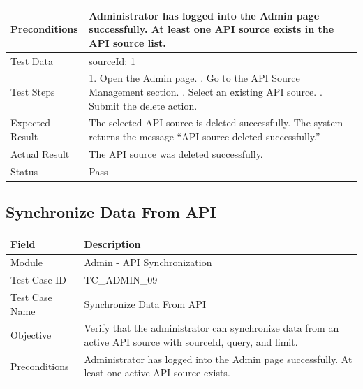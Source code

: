 \documentclass[12pt,a4paper]{article}
\begin{document}
{{\begin{longtable}{|p{4cm}|p{10cm}|}
	Preconditions &
	Administrator has logged into the Admin page successfully. \newline
	At least one API source exists in the API source list.
	\\ \hline
	
	Test Data &
	sourceId: 1
	\\ \hline
	
	Test Steps &
	1. Open the Admin page. \newline
	2. Go to the API Source Management section. \newline
	3. Select an existing API source. \newline
	4. Submit the delete action.
	\\ \hline
	
	Expected Result &
	The selected API source is deleted successfully. The system returns the message ``API source deleted successfully.'' \\ \hline
	
	Actual Result &
	The API source was deleted successfully. \\ \hline
	
	Status & Pass \\ \hline
	
\end{longtable}
\subsection{Synchronize Data From API}
\begin{longtable}{|p{4cm}|p{10cm}|}
	\hline
	\textbf{Field} & \textbf{Description} \\ \hline
	
	Module & Admin - API Synchronization \\ \hline
	
	Test Case ID & TC\_ADMIN\_09 \\ \hline
	
	Test Case Name & Synchronize Data From API \\ \hline
	
	Objective &
	Verify that the administrator can synchronize data from an active API source with sourceId, query, and limit. \\ \hline
	
	Preconditions &
	Administrator has logged into the Admin page successfully. \newline
	At least one active API source exists.
	\\ \hline
	

\end{longtable}}}
\end{document}

